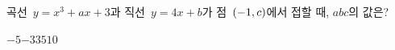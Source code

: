 곡선~$y=x^3+ax+3$과 직선~$y=4x+b$가 점~$(-1{,}\mkern3mu\mathopen{}c)$에서 접할 때, $abc$의 값은? 
\begin{choices32}{$-5$}{$-3$}{$3$}{$5$}{$10$}\end{choices32}
